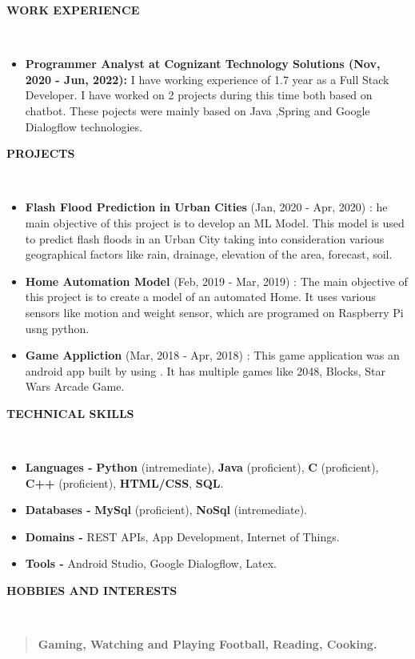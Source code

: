 \documentclass[a4paper,10pt]{article}
\newcommand{\lsep}{-0.4cm}
\newcommand{\resheading}[1]{{\small \colorbox{mygrey}{\begin{minipage}{0.975\textwidth}{\textbf{#1 \vphantom{p\^{E}}}}\end{minipage}}}}
\begin{document}
	\vspace{8pt}
	
	\resheading{\textbf{WORK EXPERIENCE} }\\[\lsep]
	\begin{itemize}
		\setlength\itemsep{0.5em}
		\item \textbf{ Programmer Analyst at Cognizant Technology Solutions (Nov, 2020 - Jun, 2022): } I have working experience of 1.7 year as a Full Stack Developer. I have worked on 2 projects during this time both based on chatbot. These pojects were mainly based on Java ,Spring and Google Dialogflow technologies.
	\end{itemize}

	\vspace{8pt}

	\resheading{\textbf{PROJECTS} }\\[\lsep]
	\begin{itemize}
		\setlength\itemsep{0.7em}
		\item \textbf{Flash Flood Prediction in Urban Cities} (Jan, 2020 - Apr, 2020) : he main objective of this project is to develop
		an ML Model. This model is used to predict flash floods in an
		Urban City taking into consideration various geographical factors like rain, drainage, elevation of the area, forecast, soil.
		\item \textbf{Home Automation Model} (Feb, 2019 - Mar, 2019) : The main objective of this project is to create a model of an automated Home.
		It uses various sensors like motion and weight sensor, which are programed on
		Raspberry Pi usng python.
		\item \textbf{Game Appliction} (Mar, 2018 - Apr, 2018) : This game application was an android app built by using . It has multiple games like 2048, Blocks, Star Wars Arcade Game.
	\end{itemize}

	\vspace{8pt}
	
	\resheading{\textbf{TECHNICAL SKILLS} }\\[\lsep]
	
	\begin{itemize}
		\setlength\itemsep{0em}
		\item \noindent \textbf{Languages - } \textbf{Python} (intremediate), \textbf{Java} (proficient), \textbf{C} (proficient), \textbf{C++} (proficient), \textbf{HTML/CSS}, \textbf{SQL}.
		\item \noindent \textbf{Databases - } \textbf{MySql} (proficient), \textbf{NoSql} (intremediate).
		\item \noindent\textbf{Domains - }REST APIs, App Development, Internet of Things.
		\item \noindent\textbf{Tools - }Android Studio, Google Dialogflow, Latex. \\
	\end{itemize}

	\vspace{8pt}
	
	\resheading{\textbf{HOBBIES AND INTERESTS} }\\[\lsep]
	
	\begin{quote}
		\setlength\itemsep{0em}
		\textbf{Gaming, Watching and Playing Football, Reading, Cooking.} \\
	\end{quote}


	
\end{document}
